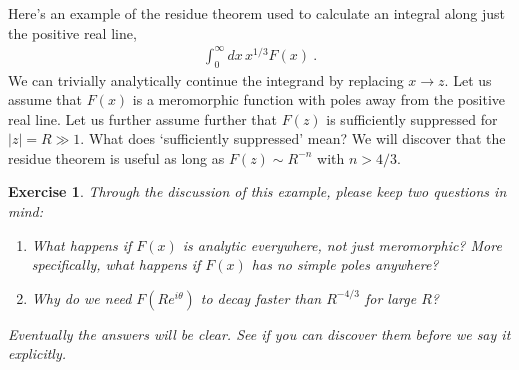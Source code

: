 \documentclass[
  11pt,
	colorful,
	raggedright,
]{tufte-style-thesis-flip}
\newtheorem{exercise}{Exercise}[section]
\begin{document}
 Here's an example of the residue theorem used to calculate an integral along just the positive real line,
 \begin{align}
  \int_0^\infty dx\, x^{1/3} F(x) \ .
 \end{align}
 We can trivially analytically continue the integrand by replacing $x\to z$. Let us assume that $F(x)$ is a meromorphic function with poles away from the positive real line. Let us further assume further that $F(z)$ is sufficiently suppressed for $|z| = R \gg 1$. What does `sufficiently suppressed' mean? We will discover that the residue theorem is useful as long as $F(z) \sim R^{-n}$ with $n>4/3$. 

\begin{exercise}
Through the discussion of this example, please keep two questions in mind:
\begin{enumerate}
  \item What happens if $F(x)$ is analytic everywhere, not just meromorphic? More specifically, what happens if $F(x)$ has no simple poles anywhere?
  \item Why do we need $F\left(Re^{i\theta}\right)$ to decay faster than $R^{-4/3}$ for large $R$?
\end{enumerate}
Eventually the answers will be clear. See if you can discover them before we say it explicitly.
\end{exercise}
  
\end{document}
